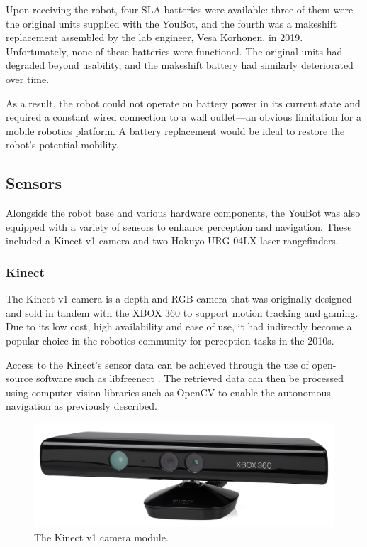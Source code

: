 \documentclass[a4paper, 12pt]{article}
\begin{document}
    Upon receiving the robot, four SLA batteries were available: three of them were the original units supplied with the YouBot, and the fourth was a makeshift replacement assembled by the lab engineer, Vesa Korhonen, in 2019. Unfortunately, none of these batteries were functional. The original units had degraded beyond usability, and the makeshift battery had similarly deteriorated over time.

    As a result, the robot could not operate on battery power in its current state and required a constant wired connection to a wall outlet—an obvious limitation for a mobile robotics platform. A battery replacement would be ideal to restore the robot's potential mobility. 

    \subsection{Sensors}
    
    Alongside the robot base and various hardware components, the YouBot was also equipped with a variety of sensors to enhance perception and navigation. These included a Kinect v1 camera and two Hokuyo URG-04LX laser rangefinders. 

    \subsubsection{Kinect}  

    The Kinect v1 camera is a depth and RGB camera that was originally designed and sold in tandem with the XBOX 360 to support motion tracking and gaming. Due to its low cost, high availability and ease of use, it had indirectly become a popular choice in the robotics community for perception tasks in the 2010s. 

    Access to the Kinect's sensor data can be achieved through the use of open-source software such as libfreenect \cite{OpenKinectLibfreenect}. The retrieved data can then be processed using computer vision libraries such as OpenCV to enable the autonomous navigation as previously described. 

    \begin{figure}[ht]
        \centering
        \includegraphics[width=0.5\linewidth]{images/sec2/kinectv1.png}
        \caption{The Kinect v1 camera module.}
    \end{figure}
\end{document}
